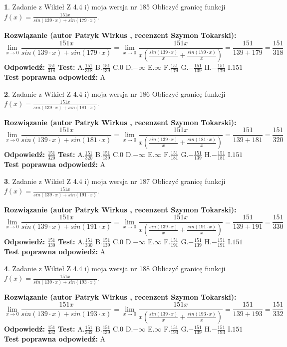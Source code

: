 \documentclass[12pt, a4paper]{article}
\theoremstyle{definition} %
\newtheorem{zad}{}
\newcommand{\zadStart}[1]{\begin{zad}#1\newline}
\newcommand{\zadStop}{\end{zad}}
\newcommand{\rozwStart}[2]{\noindent \textbf{Rozwiązanie (autor #1 , recenzent #2): }\newline}
\newcommand{\rozwStop}{\newline}
\newcommand{\odpStart}{\noindent \textbf{Odpowiedź:}\newline}
\newcommand{\odpStop}{\newline}
\newcommand{\testStart}{\noindent \textbf{Test:}\newline}
\newcommand{\testStop}{\newline}
\newcommand{\kluczStart}{\noindent \textbf{Test poprawna odpowiedź:}\newline}
\newcommand{\kluczStop}{\newline}
\begin{document}
\zadStart{Zadanie z Wikieł Z 4.4 i) moja wersja nr 185}
Obliczyć granicę funkcji $f(x)=\frac{151x}{sin(139\cdot x) +sin(179\cdot x)}$.
\zadStop
\rozwStart{Patryk Wirkus}{Szymon Tokarski}
$$\lim\limits_{x\to 0}\frac{151x}{sin(139\cdot x) +sin(179\cdot x)}=\lim\limits_{x\to 0}\frac{151x}{x(\frac{sin(139\cdot x)}{x}+\frac{sin(179\cdot x)}{x})}=\frac{151}{139+179} = \frac{151}{318}$$
\rozwStop
\odpStart
$\frac{151}{318}$
\odpStop
\testStart
A.$\frac{151}{318}$
B.$\frac{151}{139}$
C.$0$
D.$-\infty$
E.$\infty$
F.$\frac{151}{179}$
G.$-\frac{151}{139}$
H.$-\frac{151}{179}$
I.$151$
\testStop
\kluczStart
A
\kluczStop



\zadStart{Zadanie z Wikieł Z 4.4 i) moja wersja nr 186}
Obliczyć granicę funkcji $f(x)=\frac{151x}{sin(139\cdot x) +sin(181\cdot x)}$.
\zadStop
\rozwStart{Patryk Wirkus}{Szymon Tokarski}
$$\lim\limits_{x\to 0}\frac{151x}{sin(139\cdot x) +sin(181\cdot x)}=\lim\limits_{x\to 0}\frac{151x}{x(\frac{sin(139\cdot x)}{x}+\frac{sin(181\cdot x)}{x})}=\frac{151}{139+181} = \frac{151}{320}$$
\rozwStop
\odpStart
$\frac{151}{320}$
\odpStop
\testStart
A.$\frac{151}{320}$
B.$\frac{151}{139}$
C.$0$
D.$-\infty$
E.$\infty$
F.$\frac{151}{181}$
G.$-\frac{151}{139}$
H.$-\frac{151}{181}$
I.$151$
\testStop
\kluczStart
A
\kluczStop



\zadStart{Zadanie z Wikieł Z 4.4 i) moja wersja nr 187}
Obliczyć granicę funkcji $f(x)=\frac{151x}{sin(139\cdot x) +sin(191\cdot x)}$.
\zadStop
\rozwStart{Patryk Wirkus}{Szymon Tokarski}
$$\lim\limits_{x\to 0}\frac{151x}{sin(139\cdot x) +sin(191\cdot x)}=\lim\limits_{x\to 0}\frac{151x}{x(\frac{sin(139\cdot x)}{x}+\frac{sin(191\cdot x)}{x})}=\frac{151}{139+191} = \frac{151}{330}$$
\rozwStop
\odpStart
$\frac{151}{330}$
\odpStop
\testStart
A.$\frac{151}{330}$
B.$\frac{151}{139}$
C.$0$
D.$-\infty$
E.$\infty$
F.$\frac{151}{191}$
G.$-\frac{151}{139}$
H.$-\frac{151}{191}$
I.$151$
\testStop
\kluczStart
A
\kluczStop



\zadStart{Zadanie z Wikieł Z 4.4 i) moja wersja nr 188}
Obliczyć granicę funkcji $f(x)=\frac{151x}{sin(139\cdot x) +sin(193\cdot x)}$.
\zadStop
\rozwStart{Patryk Wirkus}{Szymon Tokarski}
$$\lim\limits_{x\to 0}\frac{151x}{sin(139\cdot x) +sin(193\cdot x)}=\lim\limits_{x\to 0}\frac{151x}{x(\frac{sin(139\cdot x)}{x}+\frac{sin(193\cdot x)}{x})}=\frac{151}{139+193} = \frac{151}{332}$$
\rozwStop
\odpStart
$\frac{151}{332}$
\odpStop
\testStart
A.$\frac{151}{332}$
B.$\frac{151}{139}$
C.$0$
D.$-\infty$
E.$\infty$
F.$\frac{151}{193}$
G.$-\frac{151}{139}$
H.$-\frac{151}{193}$
I.$151$
\testStop
\kluczStart
A
\kluczStop
\end{document}
